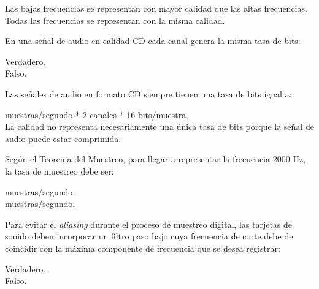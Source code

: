 \documentclass[legalpaper, 12pt, addpoints]{exam}
\begin{document}
\begin{questions}
\begin{oneparchoices}
  \choice Las bajas frecuencias se representan con mayor calidad que las altas frecuencias.\\
  \choice Todas las frecuencias se representan con la misma calidad.
\end{oneparchoices}
  
\vspace{0.10in}

\question En una señal de audio en calidad CD cada canal genera la misma tasa de bits:

\begin{oneparchoices}
  \choice Verdadero.\\
  \choice Falso.
\end{oneparchoices}
  
\vspace{0.10in}

\question Las señales de audio en formato CD siempre tienen una tasa de bits igual a:

\begin{oneparchoices}
   muestras/segundo * 2 canales * 16 bits/muestra.\\
  \choice La calidad no representa necesariamente una única tasa de
  bits porque la señal de audio puede estar comprimida.
\end{oneparchoices}
  
\vspace{0.10in}

\question Según el Teorema del Muestreo, para llegar a representar la
frecuencia 2000 Hz, la tasa de muestreo debe ser:

\begin{oneparchoices}
   muestras/segundo.\\
   muestras/segundo.
\end{oneparchoices}
  
\vspace{0.10in}

\question Para evitar el \emph{aliasing} durante el proceso de
muestreo digital, las tarjetas de sonido deben incorporar un filtro
paso bajo cuya frecuencia de corte debe de coincidir con la máxima
componente de frecuencia que se desea registrar:

\begin{oneparchoices}
  \choice Verdadero.\\
  \choice Falso.
\end{oneparchoices}
  

\end{questions}
\end{document}
